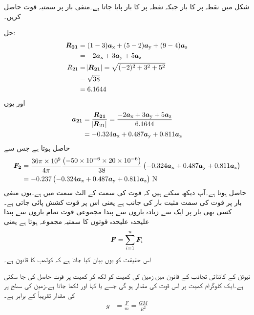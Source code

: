 شکل  میں نقطہ  پر  کا بار  جبکہ نقطہ  پر  کا بار  پایا جاتا ہے۔منفی بار  پر سمتیہ قوت حاصل کریں۔

حل:
\begin{align*}
{\ensuremath{{\boldsymbol{R_{21}}}}}&=(1-3) {\boldsymbol{a}}_{\textup{x}}+(5-2) {\boldsymbol{a}}_{\textup{y}}+(9-4){\boldsymbol{a}}_{\textup{z}}\\
&=-2 {\boldsymbol{a}}_{\textup{x}}+3 {\boldsymbol{a}}_{\textup{y}}+5 {\boldsymbol{a}}_{\textup{z}}\\
R_{21}&=\abs{{{\boldsymbol{R_{21}}}}}=\sqrt{(-2)^2+3^2+5^2}\\
&=\sqrt{38}\\
&=6.1644
\end{align*}
اور یوں
\begin{align*}
{\ensuremath{{\boldsymbol{a_{21}}}}}&=\frac{{{{\boldsymbol{R_{21}}}}}}{\abs{{{\boldsymbol{R}}}_{21}}}=\frac{-2 {{\boldsymbol{a}}_{\textup{x}}}+3 {{\boldsymbol{a}}_{\textup{y}}}+5 {\boldsymbol{a}}_{\textup{z}}}{6.1644}\\
&=-0.324 {\boldsymbol{a}}_{\textup{x}}+0.487 {\boldsymbol{a}}_{\textup{y}}+0.811{\boldsymbol{a}}_{\textup{z}}
\end{align*}
حاصل ہوتا ہے جس سے
\begin{align*}
{\ensuremath{{\boldsymbol{F_2}}}}&=\frac{36 \pi  \times 10^9}{4 \pi} \frac{\left (-50\times 10^{-6} \times 20 \times 10^{-6} \right )}{38} \left(-0.324 {\boldsymbol{a}}_{\textup{x}}+0.487 {\boldsymbol{a}}_{\textup{y}}+0.811{\boldsymbol{a}}_{\textup{z}}\right)\\
&=-0.237  \left(-0.324 {\boldsymbol{a}}_{\textup{x}}+0.487 {\boldsymbol{a}}_{\textup{y}}+0.811{\boldsymbol{a}}_{\textup{z}} \right) \, \si{\newton}
\end{align*}
حاصل ہوتا ہے۔آپ دیکھ سکتے ہیں کہ قوت کی سمت  کے الٹ سمت میں ہے۔یوں منفی بار پر قوت کی سمت مثبت بار کی جانب ہے یعنی اس پر قوت کشش پائی جاتی ہے۔
کسی بھی بار پر ایک سے زیادہ باروں سے پیدا مجموعی قوت تمام باروں سے پیدا علیحدہ علیحدہ قوتوں کا سمتیہ مجموعہ ہوتا ہے یعنی
\begin{align}
{\ensuremath{{\boldsymbol{F}}}}=\sum_{i=1}^n {{\boldsymbol{F}}}_i
\end{align}
اس حقیقت کو یوں بیان کیا جاتا ہے کہ کولمب کا قانون  ہے۔ 

نیوٹن کے کائناتی تجاذب کے قانون میں زمین کی کمیت کو  لکھ کر کمیت  پر قوت  حاصل کی جا سکتی ہے۔ایک کلوگرام کمیت پر اس قوت کی مقدار  ہو گی جسے  یا  کہا اور  لکھا جاتا ہے۔زمین کی سطح پر  کی مقدار تقریباً  کے برابر ہے۔
\begin{align}\label{مساوات_کولمب_زمین_کی_کشش}
g&=\frac{F}{m}=\frac{GM}{R^2}
\end{align}

